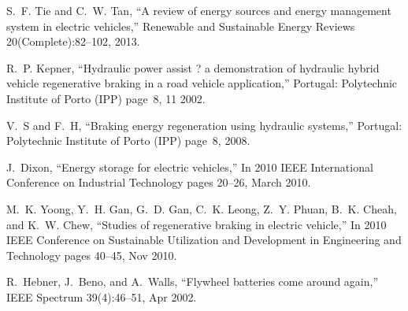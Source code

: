 S.~F. Tie and C.~W. Tan,
\newblock ``A review of energy sources and energy management system in electric vehicles,''
\newblock Renewable and Sustainable Energy Reviews 20(Complete):82--102, 2013.

R.~P. Kepner,
\newblock ``Hydraulic power assist ? a demonstration of hydraulic hybrid vehicle
  regenerative braking in a road vehicle application,''
\newblock Portugal: Polytechnic Institute of Porto (IPP) page~8, 11
  2002.

V.~S and F.~H,
\newblock ``Braking energy regeneration using hydraulic systems,''
\newblock Portugal: Polytechnic Institute of Porto (IPP) page~8, 2008.

J.~Dixon,
\newblock ``Energy storage for electric vehicles,''
\newblock In 2010 IEEE International Conference on Industrial Technology
  pages 20--26, March 2010.

M.~K. Yoong, Y.~H. Gan, G.~D. Gan, C.~K. Leong, Z.~Y. Phuan, B.~K. Cheah, and K.~W. Chew,
\newblock ``Studies of regenerative braking in electric vehicle,''
\newblock In 2010 IEEE Conference on Sustainable Utilization and
  Development in Engineering and Technology pages 40--45, Nov 2010.

R.~Hebner, J.~Beno, and A.~Walls,
\newblock ``Flywheel batteries come around again,''
\newblock IEEE Spectrum 39(4):46--51, Apr 2002.











